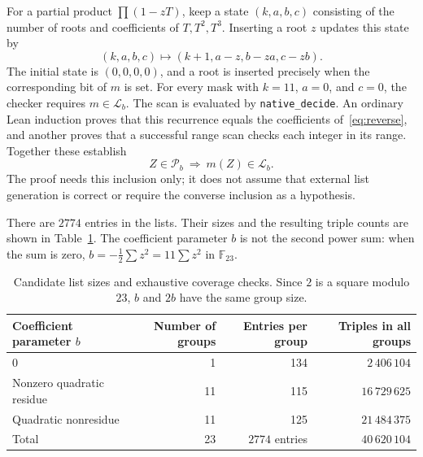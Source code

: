 \documentclass[11pt,a4paper]{article}
\theoremstyle{remark}
\newcommand{\F}{\mathbb F_{23}}
\begin{document}
For a partial product $\prod(1-zT)$, keep a state $(k,a,b,c)$ consisting of
the number of roots and coefficients of $T,T^2,T^3$. Inserting a root $z$
updates this state by
\begin{equation}\label{eq:recurrence}
 (k,a,b,c)\longmapsto(k+1,a-z,b-za,c-zb).
\end{equation}
The initial state is $(0,0,0,0)$, and a root is inserted precisely when the
corresponding bit of $m$ is set. For every mask with $k=11$, $a=0$, and $c=0$,
the checker requires $m\in\mathcal L_b$.
The scan is evaluated by \texttt{native\_decide}. An ordinary Lean induction
proves that this recurrence equals the coefficients of~\eqref{eq:reverse},
and another proves that a successful range scan checks each integer in its range.
Together these establish
\begin{equation}\label{eq:list-complete}
 Z\in\mathcal P_b\ \Longrightarrow\ m(Z)\in\mathcal L_b.
\end{equation}
The proof needs this inclusion only; it does not assume that external list
generation is correct or require the converse inclusion as a hypothesis.

There are $2774$ entries in the lists. Their sizes and the resulting triple
counts are shown in Table~\ref{tab:counts}. The coefficient parameter $b$ is
not the second power sum: when the sum is zero,
$b=-\frac12\sum z^2=11\sum z^2$ in $\F$.

\begin{table}[ht]
\centering
\begin{tabular}{lrrr}
\toprule
Coefficient parameter $b$ & Number of groups & Entries per group & Triples in all groups\\
\midrule
$0$ & 1 & 134 & $2\,406\,104$\\
Nonzero quadratic residue & 11 & 115 & $16\,729\,625$\\
Quadratic nonresidue & 11 & 125 & $21\,484\,375$\\
\midrule
Total & 23 & $2774$ entries & $40\,620\,104$\\
\bottomrule
\end{tabular}
\caption{Candidate list sizes and exhaustive coverage checks. Since $2$ is a
square modulo $23$, $b$ and $2b$ have the same group size.}
\label{tab:counts}
\end{table}
\end{document}
